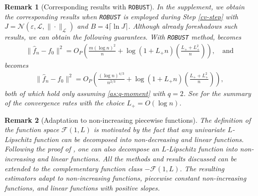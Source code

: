 \documentclass[12pt]{article}
\newtheorem{remark}{Remark}[section]
\begin{document}
\begin{remark}[Corresponding results with \texttt{ROBUST}]
    In the supplement, we obtain the corresponding results when \texttt{ROBUST} is employed during Step \ref{cv-step} with $J = \mathcal{\mathcal{N}\left(\varepsilon, \mathcal{L}, \|\cdot\|_{\mathcal{L}}\right)}$ and $B = 4 \lceil \ln J \rceil$. Although  already foreshadows such results, we can obtain the following guarantees. With \texttt{ROBUST} method,  becomes
    \begin{align}
        \|\widehat f_n - f_0\|^2 = O_P\left( \frac{m (\log n)^2}{n} + \log (1+ L_+n) \left(\frac{L_++L_+^2}{n}\right)\right), \quad \text{and}
    \end{align} becomes
    \begin{align}
		\|\widehat f_n - f_0\|^2= O_P\left( 
		 \frac{(\log n)^{4/3}}{n^{2/3}} + \log (1+ L_+ n) \left(\frac{L_++L_+^2}{n}\right) \right), 
	\end{align}
    both of which hold only assuming \ref{as:q-moment} with $q=2$. See  for the summary of the convergence rates with the choice $L_+ = O(\log n)$.
\end{remark}




\begin{remark}[Adaptation to non-increasing piecewise functions]\label{remark:alt-adaptivity}
The definition of the function space $\mathcal{F}(1, L)$ is motivated by the fact that any univariate $L$-Lipschitz function can be decomposed into non-decreasing and linear functions. Following the proof of , one can also decompose an $L$-Lipschitz function into non-increasing and linear functions. All the methods and results discussed can be extended to the complementary function class $-\mathcal{F}(1, L)$. The resulting estimators adapt to non-increasing functions, piecewise constant non-increasing functions, and linear functions with positive slopes.  
\end{remark}
\end{document}
